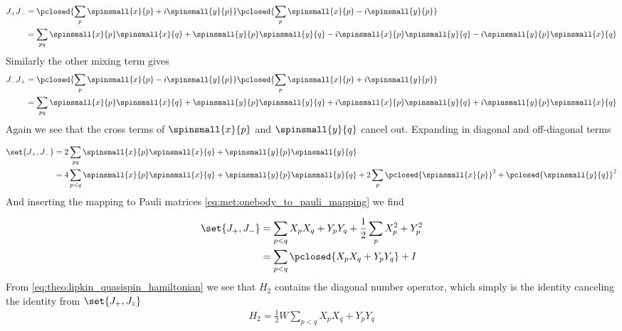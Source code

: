 \begin{align*}
    J_+ J_- &= \pclosed{\sum_p \spinsmall{x}{p} + i\spinsmall{y}{p}} \pclosed{\sum_p \spinsmall{x}{p} - i\spinsmall{y}{p}} \\
    &= \sum_{pq} \spinsmall{x}{p}\spinsmall{x}{q} + \spinsmall{y}{p}\spinsmall{y}{q} -i \spinsmall{x}{p}\spinsmall{y}{q} -i \spinsmall{y}{p}\spinsmall{x}{q}
\end{align*}
Similarly the other mixing term gives
\begin{align*}
    J_- J_+ &= \pclosed{\sum_p \spinsmall{x}{p} - i\spinsmall{y}{p}} \pclosed{\sum_p \spinsmall{x}{p} + i\spinsmall{y}{p}} \\
    &= \sum_{pq} \spinsmall{x}{p}\spinsmall{x}{q} + \spinsmall{y}{p}\spinsmall{y}{q} +i \spinsmall{x}{p}\spinsmall{y}{q} +i \spinsmall{y}{p}\spinsmall{x}{q}
\end{align*}
Again we see that the cross terms of $\spinsmall{x}{p}$ and $\spinsmall{y}{q}$ cancel out. Expanding in diagonal and off-diagonal terms

\begin{align*}
    \set{J_+, J_-} &= 2 \sum_{pq} \spinsmall{x}{p}\spinsmall{x}{q} + \spinsmall{y}{p}\spinsmall{y}{q} \\
    &= 4 \sum_{p < q} \spinsmall{x}{p}\spinsmall{x}{q} + \spinsmall{y}{p}\spinsmall{y}{q} + 2\sum_{p} \pclosed{\spinsmall{x}{p}}^2 + \pclosed{\spinsmall{y}{q}}^2
\end{align*}
And inserting the mapping to Pauli matrices \cref{eq:met:onebody_to_pauli_mapping} we find

\begin{align*}
    \set{J_+, J_-} &= \sum_{p < q} X_p X_q + Y_p Y_q + \frac{1}{2}\sum_{p}X_p^2 + Y_p^2 \\
     &= \sum_{p < q} \pclosed{X_p X_q + Y_p Y_q} + I
\end{align*}
From \cref{eq:theo:lipkin_quasispin_hamiltonian} we see that $H_2$ contains the diagonal number operator, which simply is the identity canceling the identity from $\set{J_+, J_z}$
\begin{align}
    H_2 = \frac{1}{2}W \sum_{p < q} X_p X_q + Y_p Y_q 
\end{align}

